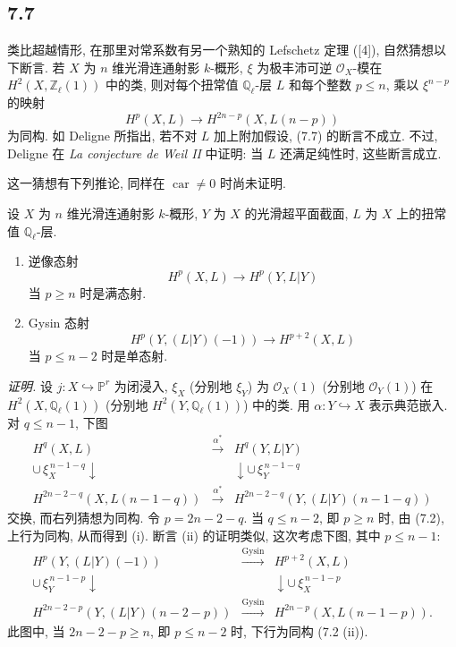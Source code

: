 \subsection*{7.7}

类比超越情形, 在那里对常系数有另一个熟知的 Lefschetz 定理 ([4]), 自然猜想以下断言. 若 $X$ 为 $n$ 维光滑连通射影 $k$-概形, $\xi$ 为极丰沛可逆 $\mathcal O_X$-模在 $H^2(X,\mathbb Z_\ell(1))$ 中的类, 则对每个扭常值 $\mathbb Q_\ell$-层 $L$ 和每个整数 $p\le n$, 乘以 $\xi^{n-p}$ 的映射
\[
H^p(X,L)\to H^{2n-p}(X,L(n-p))
\]
为同构. 如 Deligne 所指出, 若不对 $L$ 加上附加假设, (7.7) 的断言不成立. 不过, Deligne 在 \emph{La conjecture de Weil II} 中证明: 当 $L$ 还满足纯性时, 这些断言成立.

这一猜想有下列推论, 同样在 $\operatorname{car}\ne0$ 时尚未证明.

设 $X$ 为 $n$ 维光滑连通射影 $k$-概形, $Y$ 为 $X$ 的光滑超平面截面, $L$ 为 $X$ 上的扭常值 $\mathbb Q_\ell$-层.
\begin{enumerate}[label=(\roman*)]
\item 逆像态射
\[
H^p(X,L)\to H^p(Y,L|Y)
\]
当 $p\ge n$ 时是满态射.
\item Gysin 态射
\[
H^p(Y,(L|Y)(-1))\to H^{p+2}(X,L)
\]
当 $p\le n-2$ 时是单态射.
\end{enumerate}

\emph{证明.} 设 $j:X\hookrightarrow\mathbb P^r$ 为闭浸入, $\xi_X$ (分别地 $\xi_Y$) 为 $\mathcal O_X(1)$ (分别地 $\mathcal O_Y(1)$) 在 $H^2(X,\mathbb Q_\ell(1))$ (分别地 $H^2(Y,\mathbb Q_\ell(1))$) 中的类. 用 $\alpha:Y\hookrightarrow X$ 表示典范嵌入. 对 $q\le n-1$, 下图
\[
\begin{array}{ccc}
H^q(X,L)&\xrightarrow{\alpha^*}&H^q(Y,L|Y)\\
\cup\,\xi_X^{\,n-1-q}\downarrow&&\downarrow\cup\,\xi_Y^{\,n-1-q}\\
H^{2n-2-q}(X,L(n-1-q))&\xrightarrow{\alpha^*}&
H^{2n-2-q}(Y,(L|Y)(n-1-q))
\end{array}
\]
交换, 而右列猜想为同构. 令 $p=2n-2-q$. 当 $q\le n-2$, 即 $p\ge n$ 时, 由 (7.2), 上行为同构, 从而得到 (i). 断言 (ii) 的证明类似, 这次考虑下图, 其中 $p\le n-1$:
\[
\begin{array}{ccc}
H^p(Y,(L|Y)(-1))&\xrightarrow{\mathrm{Gysin}}&H^{p+2}(X,L)\\
\cup\,\xi_Y^{\,n-1-p}\downarrow&&\downarrow\cup\,\xi_X^{\,n-1-p}\\
H^{2n-2-p}(Y,(L|Y)(n-2-p))&\xrightarrow{\mathrm{Gysin}}&
H^{2n-p}(X,L(n-1-p)).
\end{array}
\]
此图中, 当 $2n-2-p\ge n$, 即 $p\le n-2$ 时, 下行为同构 (7.2 (ii)).


